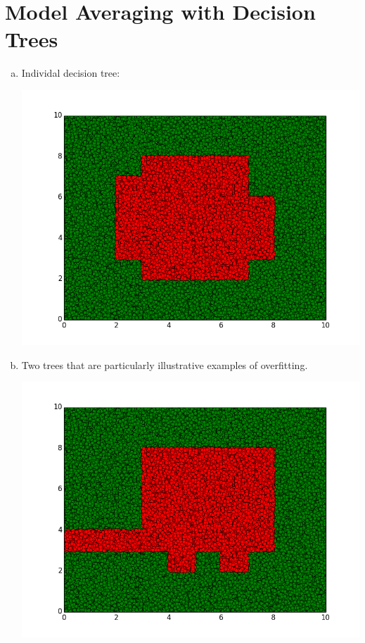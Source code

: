 \documentclass{article}
\begin{document}
\section{Model Averaging with Decision Trees}

\begin{enumerate}[(a)]
\item Individal decision tree:

\includegraphics[scale=.5]{2a.png}

\item Two trees that are particularly illustrative examples of overfitting.

\includegraphics[scale=.5]{2b-herp1.png}


\end{enumerate}
\end{document}
